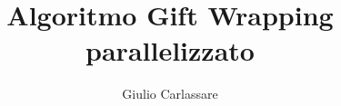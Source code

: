 \documentclass[a4paper,11pt]{article}
\begin{document}
\author{Giulio Carlassare}
\title{Algoritmo Gift Wrapping parallelizzato}
\maketitle

\tableofcontents






\end{document}
